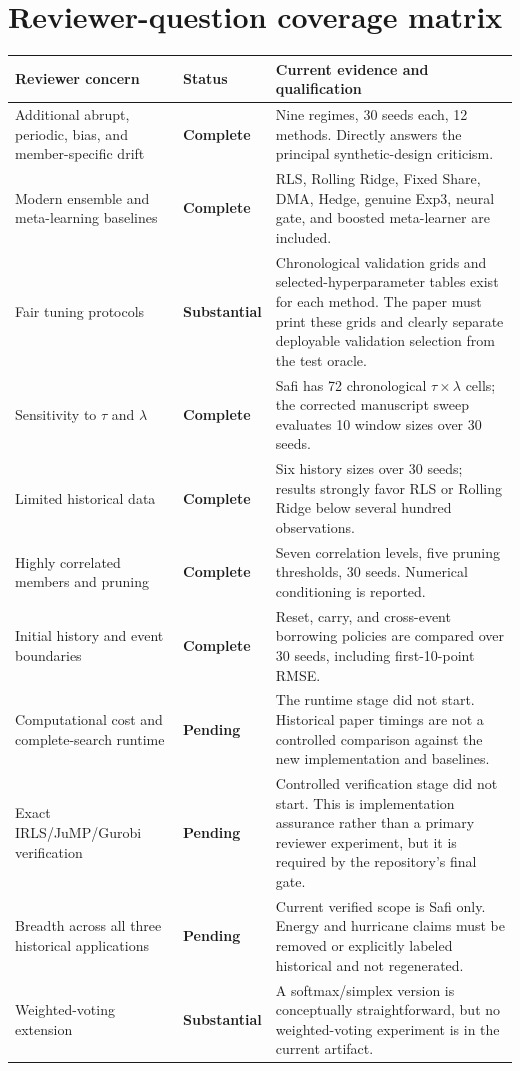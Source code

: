 \documentclass[10pt]{report}
\newcommand{\complete}{\cellcolor{good}\textbf{Complete}}
\newcommand{\substantial}{\cellcolor{partial}\textbf{Substantial}}
\newcommand{\pending}{\cellcolor{missing}\textbf{Pending}}
\begin{document}
\section{Reviewer-question coverage matrix}
\begin{longtable}{p{}p{}p{}}
\toprule
Reviewer concern & Status & Current evidence and qualification \\
\midrule
\endhead
Additional abrupt, periodic, bias, and member-specific drift & \complete & Nine regimes, 30 seeds each, 12 methods. Directly answers the principal synthetic-design criticism. \\
Modern ensemble and meta-learning baselines & \complete & RLS, Rolling Ridge, Fixed Share, DMA, Hedge, genuine Exp3, neural gate, and boosted meta-learner are included. \\
Fair tuning protocols & \substantial & Chronological validation grids and selected-hyperparameter tables exist for each method. The paper must print these grids and clearly separate deployable validation selection from the test oracle. \\
Sensitivity to $\tau$ and $\lambda$ & \complete & Safi has 72 chronological $\tau\times\lambda$ cells; the corrected manuscript sweep evaluates 10 window sizes over 30 seeds. \\
Limited historical data & \complete & Six history sizes over 30 seeds; results strongly favor RLS or Rolling Ridge below several hundred observations. \\
Highly correlated members and pruning & \complete & Seven correlation levels, five pruning thresholds, 30 seeds. Numerical conditioning is reported. \\
Initial history and event boundaries & \complete & Reset, carry, and cross-event borrowing policies are compared over 30 seeds, including first-10-point RMSE. \\
Computational cost and complete-search runtime & \pending & The runtime stage did not start. Historical paper timings are not a controlled comparison against the new implementation and baselines. \\
Exact IRLS/JuMP/Gurobi verification & \pending & Controlled verification stage did not start. This is implementation assurance rather than a primary reviewer experiment, but it is required by the repository's final gate. \\
Breadth across all three historical applications & \pending & Current verified scope is Safi only. Energy and hurricane claims must be removed or explicitly labeled historical and not regenerated. \\
Weighted-voting extension & \substantial & A softmax/simplex version is conceptually straightforward, but no weighted-voting experiment is in the current artifact. \\
\bottomrule
\end{longtable}
\end{document}
